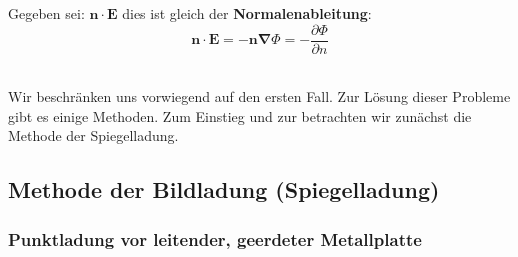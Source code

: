 \documentclass[titlepage,11pt,a4paper,ngerman]{report}
\newcommand{\prt}[2]{\frac{\partial #1}{\partial #2}}
\renewcommand{\Phi}{\varPhi}
\renewcommand{\vec}[1]{\boldsymbol{#1}}
\newcommand{\lcom}[1]{\color{MidnightBlue}#1\color{black}}
\newcommand{\vabla}{\boldsymbol{\nabla}}
\begin{document}
\noindent
\begin{minipage}{.6\linewidth}
	Gegeben sei: $ \vec{n} \cdot \vec{E} $ dies ist gleich der \textbf{Normalenableitung}:
	\begin{equation*}
	\vec{n} \cdot \vec{E} = - \vec{n} \vabla \Phi = - \prt{\Phi}{n}
	\end{equation*}
\end{minipage}%
\begin{minipage}{.4\linewidth}
	\centering
	\vspace{5pt}
\end{minipage}%
\\
\lcom{Wir beschränken uns vorwiegend auf den ersten Fall. }
\lcom{Zur Lösung dieser Probleme gibt es einige Methoden. Zum Einstieg und zur  betrachten wir zunächst die Methode der Spiegelladung. }

\subsection{Methode der Bildladung (Spiegelladung)}

\subsubsection{Punktladung vor leitender, geerdeter Metallplatte}
\end{document}
